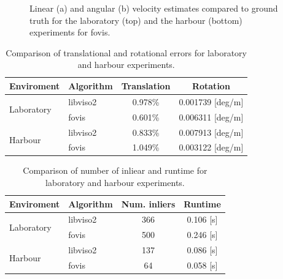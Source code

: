 \documentclass[conference]{IEEEtran}
\begin{document}
\begin{figure}[!h]
  \begin{center}
  \end{center}
  \caption{Linear (a) and angular (b) velocity estimates compared to ground truth for the laboratory (top) and the harbour (bottom) experiments for fovis.}
  \label{error-plots-fovis}
\end{figure}

\begin{table}[!t]
  \renewcommand{\arraystretch}{1.3}
  \caption{Comparison of translational and rotational errors for laboratory and harbour experiments.}
  \label{results-errors}
  \centering
  \begin{tabular}{|l|l|c|c|} \hline
    \textbf{Enviroment} & \textbf{Algorithm} & \textbf{Translation} & \textbf{Rotation}\\ \hline
    \multirow{2}{*}{Laboratory} & libviso2 & 0.978\% & 0.001739 [deg/m] \\
                                & fovis    & 0.601\% & 0.006311 [deg/m] \\ \hline
    \multirow{2}{*}{Harbour}    & libviso2 & 0.833\% & 0.007913 [deg/m] \\
                                & fovis    & 1.049\% & 0.003122 [deg/m] \\ \hline
  \end{tabular} 
\end{table}

\begin{table}[!t]
  \renewcommand{\arraystretch}{1.3}
  \caption{Comparison of number of inliear and runtime for laboratory and harbour experiments.}
  \label{results-runtime}
  \centering
  \begin{tabular}{|l|l|c|c|} \hline
    \textbf{Enviroment} & \textbf{Algorithm} & \textbf{Num. inliers} & \textbf{Runtime}\\ \hline
    \multirow{2}{*}{Laboratory} & libviso2 & 366 & 0.106 [s] \\
                                & fovis    & 500 & 0.246 [s] \\ \hline
    \multirow{2}{*}{Harbour}    & libviso2 & 137 & 0.086 [s] \\
                                & fovis    & 64 & 0.058 [s] \\ \hline
  \end{tabular} 
\end{table}
\end{document}
